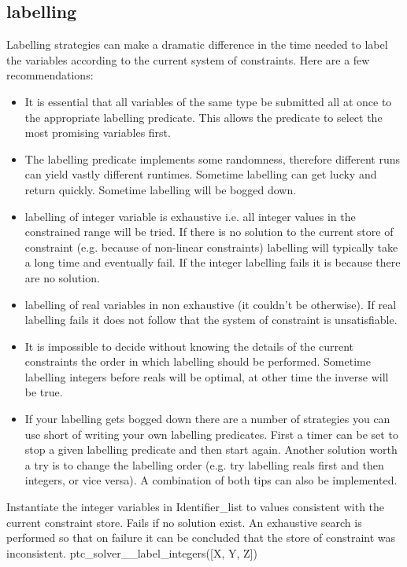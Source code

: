 \documentclass{article}
\begin{document}
\subsection{labelling}
Labelling strategies can make a dramatic difference in the time needed to label
the variables according to the current system of constraints. Here are a few recommendations:
\begin{itemize}
\item It is essential that all variables of the same type be submitted all at
once to the appropriate labelling predicate. This allows the predicate to select
the most promising variables first.
\item The labelling predicate implements some randomness, therefore different runs
can yield vastly different runtimes. Sometime labelling can get lucky and return
quickly. Sometime labelling will be bogged down.
\item labelling of integer variable is exhaustive i.e. all integer values in the
constrained range will be tried. If there is no solution to the current store of
constraint (e.g. because of non-linear constraints) labelling will typically take
a long time and eventually fail. If the integer labelling fails it is because
there are no solution.
\item labelling of real variables in non exhaustive (it couldn't be otherwise). If
real labelling fails it does not follow that the system of constraint is
unsatisfiable.
\item It is impossible to decide without knowing the details of the current
constraints the order in which labelling should be performed. Sometime labelling
integers before reals will be optimal, at other time the inverse will be true.
\item If your labelling gets bogged down there are a number of strategies you can
use short of writing your own labelling predicates. First a timer can be set to
stop a given labelling predicate and then start again. Another solution worth a
try is to change the labelling order (e.g. try labelling reals first and then
integers, or vice versa). A combination of both tips can also be implemented.
\end{itemize}


    {Instantiate the integer variables in Identifier\_list to values
consistent with
    the current constraint store. Fails if no solution exist. An exhaustive
search is performed so that on failure it can be concluded that the store
of constraint was inconsistent.}
    {ptc\_solver\_\_label\_integers([X, Y, Z])}
    {}
\end{document}
